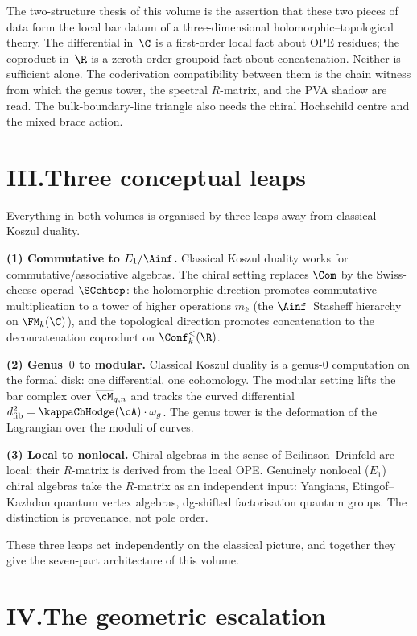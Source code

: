 The two-structure thesis of this volume is the assertion that
these two pieces of data form the local bar datum of a
three-dimensional holomorphic--topological theory. The
differential in~$\C$ is a first-order local fact about OPE
residues; the coproduct in~$\R$ is a zeroth-order groupoid fact
about concatenation. Neither is sufficient alone. The
coderivation compatibility between them is the chain witness from
which the genus tower, the spectral $R$-matrix, and the PVA shadow
are read. The bulk-boundary-line triangle also needs the chiral
Hochschild centre and the mixed brace action.

\section*{III.\quad Three conceptual leaps}

Everything in both volumes is organised by three leaps away from
classical Koszul duality.

\smallskip
\noindent\textbf{(1) Commutative to $E_1/\Ainf$.}\enspace
Classical Koszul duality works for commutative/associative
algebras. The chiral setting replaces $\Com$ by the Swiss-cheese
operad $\SCchtop$: the holomorphic direction promotes commutative
multiplication to a tower of higher operations $m_k$ (the
$\Ainf$~Stasheff hierarchy on $\FM_k(\C)$), and the topological
direction promotes concatenation to the deconcatenation coproduct
on $\Conf_k^{<}(\R)$.

\smallskip
\noindent\textbf{(2) Genus~$0$ to modular.}\enspace
Classical Koszul duality is a genus-$0$ computation on the
formal disk: one differential, one cohomology. The modular
setting lifts the bar
complex over $\overline{\cM}_{g,n}$ and tracks the curved
differential $d_{\mathrm{fib}}^2 = \kappaChHodge(\cA) \cdot \omega_g$.
The genus tower is the deformation of the Lagrangian over the
moduli of curves.

\smallskip
\noindent\textbf{(3) Local to nonlocal.}\enspace
Chiral algebras in the sense of Beilinson--Drinfeld are local:
their $R$-matrix is derived from the local OPE. Genuinely
nonlocal ($E_1$) chiral algebras take the $R$-matrix as an
independent input: Yangians, Etingof--Kazhdan quantum vertex
algebras, dg-shifted factorisation quantum groups. The
distinction is provenance, not pole order.

\smallskip
These three leaps act independently on the classical picture,
and together they give the seven-part architecture of this
volume.

\section*{IV.\quad The geometric escalation}

